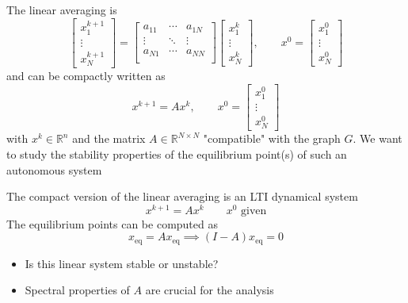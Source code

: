 \documentclass{book}
\newcommand{\R}{\mathbb{R}}
\theoremstyle{theoremv2}
\theoremstyle{defv2}
\theoremstyle{remark}
\theoremstyle{remark}
\theoremstyle{definition}
\theoremstyle{definition}
\begin{document}
The linear averaging is 
\[
    \begin{bmatrix}
        x_1^{k+1} \\ \vdots \\ x_N^{k+1}
    \end{bmatrix} = \begin{bmatrix}
        a_{11} & \cdots & a_{1N} \\
        \vdots & \ddots & \vdots \\
        a_{N1} & \cdots & a_{NN} \\
    \end{bmatrix} \begin{bmatrix}
        x_1^{k} \\ \vdots \\ x_N^{k}
    \end{bmatrix}, \qquad x^0 = \begin{bmatrix}
        x_1^{0} \\ \vdots \\ x_N^{0}
    \end{bmatrix}
\]
and can be compactly written as 
\[
    x^{k+1} = Ax^k, \qquad x^0 = \begin{bmatrix}
        x_1^{0} \\ \vdots \\ x_N^{0}
    \end{bmatrix}
\]
with $x^k\in\R^n$ and the matrix $A\in\R^{N\times N}$ "compatible" with the graph $G$.
We want to study the stability properties of the equilibrium point(s) of such an autonomous system

The compact version of the linear averaging is an LTI dynamical system
\[
    x^{k+1} = A x^k \qquad x^0 \text{ given}
\]
The equilibrium points can be computed as 
\[
    x_{\text{eq}} = A x_{\text{eq}} \implies (I-A)x_{\text{eq}} = 0
\]
\begin{itemize}
    \item Is this linear system stable or unstable?
    \item Spectral properties of $A$ are crucial for the analysis
\end{itemize}
\end{document}
